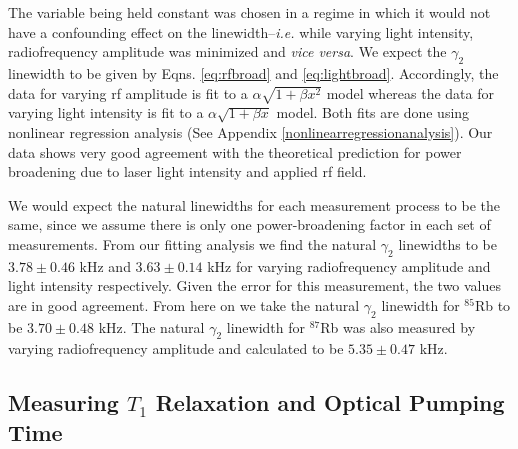The variable being held constant was chosen in a regime in which it would not have a confounding effect on the linewidth--\emph{i.e.} while varying light intensity, radiofrequency amplitude was minimized and \emph{vice versa}.  We expect the $\gamma_2$ linewidth to be given by 
Eqns. \ref{eq:rfbroad} and \ref{eq:lightbroad}. Accordingly, the data for varying rf amplitude is fit to a $\alpha \sqrt{1+\beta x^2}$ model whereas the data for varying light intensity is fit to a $\alpha \sqrt{1+\beta x}$ model.  Both fits are done using nonlinear regression analysis (See Appendix \ref{nonlinearregressionanalysis}).  Our data shows very good agreement with the theoretical prediction for power broadening due to laser light intensity and applied rf field.

We would expect the natural linewidths for each measurement process to be the same, since we assume there is only one power-broadening factor in each set of measurements. From our fitting analysis we find the natural $\gamma_2$ linewidths to be $3.78 \pm 0.46$ kHz and $3.63 \pm 0.14$ kHz for varying radiofrequency amplitude and light intensity respectively.  Given the error for this measurement, the two values are in good agreement. From here on we take the natural $\gamma_2$ linewidth for $^{85}$Rb to be $3.70 \pm 0.48$ kHz. The natural  $\gamma_2$ linewidth for $^{87}$Rb was also measured by varying radiofrequency amplitude and calculated to be $5.35 \pm 0.47$ kHz.

\subsection{Measuring $T_1$ Relaxation and Optical Pumping Time}\label{MeasuringT1RelaxationandOpticalPumpingTime}

